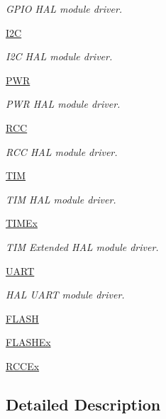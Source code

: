 \begin{DoxyCompactItemize}
\begin{DoxyCompactList}\small\item\em G\+P\+IO H\+AL module driver. \end{DoxyCompactList}\item 
\hyperlink{group___i2_c}{I2C}
\begin{DoxyCompactList}\small\item\em I2C H\+AL module driver. \end{DoxyCompactList}\item 
\hyperlink{group___p_w_r}{P\+WR}
\begin{DoxyCompactList}\small\item\em P\+WR H\+AL module driver. \end{DoxyCompactList}\item 
\hyperlink{group___r_c_c}{R\+CC}
\begin{DoxyCompactList}\small\item\em R\+CC H\+AL module driver. \end{DoxyCompactList}\item 
\hyperlink{group___t_i_m}{T\+IM}
\begin{DoxyCompactList}\small\item\em T\+IM H\+AL module driver. \end{DoxyCompactList}\item 
\hyperlink{group___t_i_m_ex}{T\+I\+M\+Ex}
\begin{DoxyCompactList}\small\item\em T\+IM Extended H\+AL module driver. \end{DoxyCompactList}\item 
\hyperlink{group___u_a_r_t}{U\+A\+RT}
\begin{DoxyCompactList}\small\item\em H\+AL U\+A\+RT module driver. \end{DoxyCompactList}\item 
\hyperlink{group___f_l_a_s_h}{F\+L\+A\+SH}
\item 
\hyperlink{group___f_l_a_s_h_ex}{F\+L\+A\+S\+H\+Ex}
\item 
\hyperlink{group___r_c_c_ex}{R\+C\+C\+Ex}
\end{DoxyCompactItemize}


\subsection{Detailed Description}
